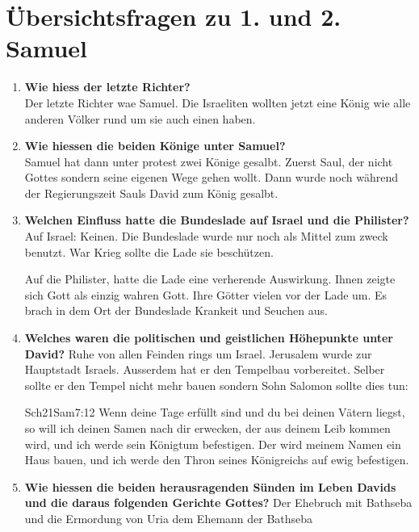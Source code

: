 \section{Übersichtsfragen zu 1. und 2. Samuel}
\begin{enumerate}
    \item \textbf{Wie hiess der letzte Richter?}\\
    Der letzte Richter wae Samuel. Die Israeliten wollten jetzt eine König wie alle anderen Völker rund um sie auch einen haben.
    \item \textbf{Wie hiessen die beiden Könige unter Samuel?}\\
    Samuel hat dann unter protest zwei Könige gesalbt. Zuerst Saul, der nicht Gottes sondern seine eigenen Wege gehen wollt. Dann wurde noch während der Regierungszeit Sauls David zum König gesalbt.
    \item \textbf{Welchen Einfluss hatte die Bundeslade auf Israel und die Philister?}
    Auf Israel: Keinen. Die Bundeslade wurde nur noch als Mittel zum zweck benutzt. War Krieg sollte die Lade sie beschützen.

    Auf die Philister, hatte die Lade eine verherende Auswirkung. Ihnen zeigte sich Gott als einzig wahren Gott. Ihre Götter vielen vor der Lade um. Es brach in dem Ort der Bundeslade Krankeit und Seuchen aus.
    \item \textbf{Welches waren die politischen und geistlichen Höhepunkte unter David?}
    Ruhe von allen Feinden rings um Israel. Jerusalem wurde zur Hauptstadt Israels. Ausserdem hat er den Tempelbau vorbereitet. Selber sollte er den Tempel nicht mehr bauen sondern Sohn Salomon sollte dies tun:
    \begin{bibeltext}{Sch2}{1Sam}{7:12}
        Wenn deine Tage erfüllt sind und du bei deinen Vätern liegst, so will ich deinen Samen nach dir erwecken, der aus deinem Leib kommen wird, und ich werde sein Königtum befestigen. Der wird meinem Namen ein Haus bauen, und ich werde den Thron seines Königreichs auf ewig befestigen.
    \end{bibeltext}
    \item \textbf{Wie hiessen die beiden herausragenden     Sünden im Leben Davids und die daraus folgenden Gerichte Gottes?}
    Der Ehebruch mit Bathseba und die Ermordung von Uria dem Ehemann der Bathseba
\end{enumerate}